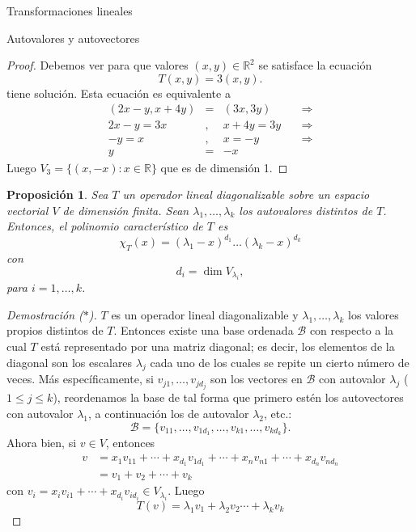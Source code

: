 \documentclass[a4paper,12pt,twoside,spanish,reqno]{amsbook}
\newtheorem{proposicion}[teorema]{Proposici\'on}
\theoremstyle{definition}
\theoremstyle{remark}
\newcommand{\R}{\mathbb R}
\begin{document}
\begin{chapter}{Transformaciones lineales}
\begin{section}{Autovalores y autovectores}
\begin{proof}
			Debemos ver para que valores  $(x,y)\in \R^2$ se satisface la ecuación
			$$
			T(x,y) = 3(x,y).
			$$
			tiene solución. Esta ecuación es equivalente a 
			\begin{equation*}
				\begin{array}{rcll}
				(2x-y,x+4y)&=&(3 x, 3 y)\quad &\Rightarrow \\
				2x-y = 3 x&,& x+4y = 3y \quad &\Rightarrow \\
				-y =  x&,& x = -y \quad &\Rightarrow \\
				y &=&  -x \quad &
				\end{array}
			\end{equation*}
			Luego $V_3 = \{(x,-x): x \in \R \}$ que es de dimensión 1.  	
			
		\end{proof}
	
		\begin{proposicion}
			 Sea $T$ un operador lineal diagonalizable sobre un espacio vectorial $V$ de dimensión finita. Sean $\lambda_1,\ldots,\lambda_k$ los autovalores distintos de $T$. Entonces,  el  polinomio característico de $T$ es
			 	$$
			 	\chi_T(x) = (\lambda_1 -x)^{d_1}\ldots(\lambda_k- x)^{d_k}
			 	$$
			 	con
			 	$$
			 	d_i =  \dim V_{\lambda_i},
			 	$$
			 	para  $i=1, \ldots, k$.
		\end{proposicion}
		\begin{proof}[Demostración ($*$)]
			$T$ es un operador lineal diagonalizable y $\lambda_1,\ldots,\lambda_k$ los valores propios distintos de $T$. Entonces existe una base ordenada $\mathcal B$ con respecto a la cual $T$ está representado por una matriz diagonal; es decir, los elementos de la diagonal son los escalares $\lambda_j$ cada uno de los cuales se repite un cierto número de veces. Más específicamente, si
			 $v_{j1},\ldots,v_{jd_j}$ son los vectores en $\mathcal{B}$ con autovalor $\lambda_j$ ($1 \le j \le k$),  reordenamos la base de tal forma que primero estén los autovectores con autovalor $\lambda_1$, a continuación los de autovalor $\lambda_2$, etc.: 
			\begin{equation*}
				\mathcal{B} = \{v_{11},\ldots,v_{1d_1},\ldots,v_{k1},\ldots,v_{kd_k}\}. 
			\end{equation*}
			Ahora bien,  si $v \in V$,  entonces 
			\begin{align*}
			v &=x_1v_{11}+\cdots+x_{d_1}v_{1d_1}+\cdots+x_nv_{n1}+\cdots+x_{d_n}v_{nd_n} \\
			&= v_1 + v_2 +\cdots + v_k
			\end{align*}
			con $v_i = x_iv_{i1}+\cdots+x_{d_i}v_{id_i} \in V_{\lambda_i}$. Luego
			\begin{equation}\label{eq-desc-vectores-propios}
				T(v)  =\lambda_1v_1+\lambda_2v_2\cdots+\lambda_kv_k
			\end{equation} 
			

\end{proof}
\end{section}
\end{chapter}
\end{document}
